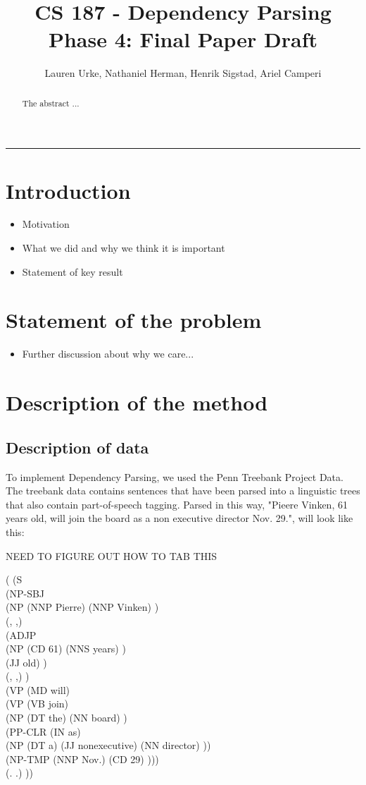 \documentclass[12pt,fleqn]{article}
\title{CS 187 - Dependency Parsing\\Phase 4: Final Paper Draft}
\author{Lauren Urke, Nathaniel Herman, Henrik Sigstad, Ariel Camperi}
\date{}
\begin{document}
    \maketitle
    \hrule
\begin{abstract}
The abstract ...
\end{abstract}
\section{Introduction}
\begin{itemize}
\item Motivation
\item What we did and why we think it is important
\item Statement of key result
\end{itemize}

\section{Statement of the problem}
\begin{itemize}
\item Further discussion about why we care...
\end{itemize}

\section{Description of the method}
\subsection{Description of data}
To implement Dependency Parsing, we used the Penn Treebank Project Data. The treebank data contains sentences that have been parsed into a linguistic trees that also contain part-of-speech tagging. Parsed in this way, "Pieere Vinken, 61 years old, will join the board as a non executive director Nov. 29.", will look like this: 

NEED TO FIGURE OUT HOW TO TAB THIS
\begin{tabbing}
( (S\\ 
 	 (NP-SBJ \\
		(NP (NNP Pierre) (NNP Vinken) )\\
		(, ,) \\
		(ADJP\\ 
			(NP (CD 61) (NNS years) )\\
			(JJ old) )\\
		(, ,) )\\
	(VP (MD will) \\
		(VP (VB join) \\
			(NP (DT the) (NN board) )\\
			(PP-CLR (IN as) \\
				(NP (DT a) (JJ nonexecutive) (NN director) ))\\
			(NP-TMP (NNP Nov.) (CD 29) )))\\
	(. .) ))
	\\
\end{tabbing}
\end{document}
